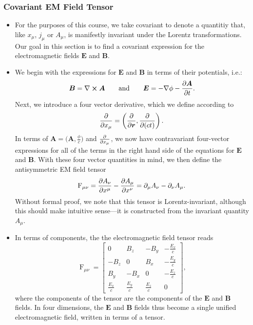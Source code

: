\documentclass[11pt, a4paper]{article}
\newcommand{\eqtext}[1]{\qquad \text{#1} \qquad}
\renewcommand{\vec}[1]{\bm{#1}} %
\renewcommand{\r}{\vec{r}}
\newcommand{\E}{\vec{E}} %
\newcommand{\B}{\vec{B}} %
\newcommand{\A}{\vec{A}} %
\renewcommand{\curl}{\nabla \cross}
\renewcommand{\grad}{\nabla}
\begin{document}
\subsubsection{Covariant EM Field Tensor}
\begin{itemize}
	\item For the purposes of this course, we take covariant to denote a quantitiy that, like $ x_{\mu} $, $ j_{\mu} $ or $ A_{\mu} $, is manifestly invariant under the Lorentz transformations. Our goal in this section is to find a covariant expression for the electromagnetic fields $ \E $ and $ \B $.
	
	\item We begin with the expressions for $ \E $ and $ \B $ in terms of their potentials, i.e.:
	\begin{equation*}
		\B = \curl \A \eqtext{and} \E = - \grad \phi - \pdv{\A}{t}.
	\end{equation*}
    Next, we introduce a four vector derivative, which we define according to
	\begin{equation*}
		\pdv{x_{\mu}} = \left(\pdv{\r}, \pdv{(ct)} \right).
	\end{equation*}
    In terms of $ \A = \big( \A, \tfrac{\phi}{c} \big) $ and $ \pdv{x_{\mu}} $, we now have contravariant four-vector expressions for all of the terms in the right hand side of the equations for $ \E $ and $ \B $. With these four vector quantities in mind, we then define the antisymmetric EM field tensor
	\begin{equation*}
        \operatorname{F}_{\mu \nu} = \pdv{A_{\nu}}{x^{\mu}} - \pdv{A_{\mu}}{x^{\nu}} = \partial_{\mu}A_{\nu} - \partial_{\nu}A_{\mu}.
	\end{equation*}
	Without formal proof, we note that this tensor is Lorentz-invariant, although this should make intuitive sense---it is constructed from the invariant quantity $ A_{\mu} $.
	
	\item In terms of components, the the electromagnetic field tensor reads
	\begin{equation*}
		\operatorname{F}_{\mu\nu} = 
	\begin{bmatrix}
        0 & B_{z} & - B_{y} & -\frac{E_{x}}{c}\\[1mm]
		- B_{z} & 0 & B_{x} & -\frac{E_{y}}{c}\\[1mm]
		B_{y} & -B_{x} & 0 & -\frac{E_{z}}{c}\\
		\frac{E_{x}}{c} & \frac{E_{y}}{c} & \frac{E_{z}}{c} & 0
	\end{bmatrix},
	\end{equation*}
	where the components of the tensor are the components of the $ \E $ and $ \B $ fields. In four dimensions, the $ \E $ and $ \B $ fields thus become a single unified electromagnetic field, written in terms of a tensor.
	

\end{itemize}
\end{document}

